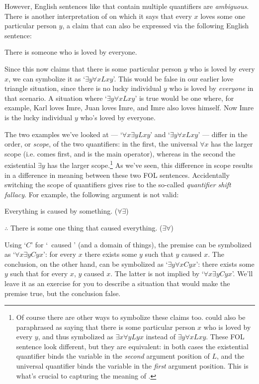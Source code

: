 However, English sentences like  that contain multiple quantifiers are \emph{ambiguous}.  There is another interpretation of  on which it says that every $x$ loves some one particular person $y$, a claim that can also be expressed via the following English sentence:
	\begin{earg}
		\item[\ex{slovbye}] There is someone who is loved by everyone.
	\end{earg}
Since this now claims that there is some particular person $y$ who is loved by every $x$, we can symbolize it as `$\exists y\forall xLxy$'.  This would be false in our earlier love triangle situation, since there is no lucky individual $y$ who is loved by \emph{everyone} in that scenario.  A situation where `$\exists y\forall xLxy$' is true would be one where, for example, Karl loves Imre, Juan loves Imre, and Imre also loves himself.  Now Imre is the lucky individual $y$ who's loved by everyone.

The two examples we've looked at ---  `$\forall x \exists yLxy$' and `$\exists y\forall xLxy$' --- differ in the order, or \emph{scope}, of the two quantifiers: in the first, the universal $\forall x$ has the larger scope (i.e. comes first, and is the main operator), whereas in the second the existential $\exists y$ has the larger scope.\footnote{Of course there are other ways to symbolize these claims too.   could also be paraphrased as saying that there is some particular person $x$ who is loved by every $y$, and thus symbolized as $\exists x\forall y Lyx$ instead of $\exists y\forall xLxy$.  These FOL sentence look different, but they are equivalent: in both cases the existential quantifier binds the variable in the \emph{second} argument position of $L$, and the universal quantifier binds the variable in the \emph{first} argument position.  This is what's crucial to capturing the meaning of .}  As we've seen, this difference in scope results in a difference in meaning between these two FOL sentences.  Accidentally switching the scope of quantifiers gives rise to the so-called \emph{quantifier shift fallacy}.  For example, the following argument is not valid:
	\begin{earg}
		\item[] Everything is caused by something. \hfill ($\forall \exists$)
		\item[$\therefore$] There is some one thing that caused everything. \hfill ($\exists \forall$)
	\end{earg}
Using `$C$' for `\blank\ caused \blank' (and a domain of things), the premise can be symbolized as `$\forall x \exists yCyx$': for every $x$ there exists some $y$ such that $y$ caused $x$.  The conclusion, on the other hand, can be symbolized as `$\exists y \forall xCyx$': there exists some $y$ such that for every $x$, $y$ caused $x$.  The latter is not implied by `$\forall x \exists yCyx$'.  We'll leave it as an exercise for you to describe a situation that would make the premise true, but the conclusion false.


